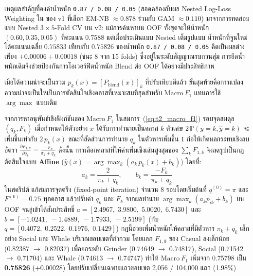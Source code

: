 เหตุผลสำคัญที่คงค่าน้ำหนัก \texttt{0.87 / 0.08 / 0.05} (สอดคล้องกับผล Nested Log-Loss Weighting ใน  ของ v1 ที่เลือก EM-NB $\approx 0.878$ ร่วมกับ GAM $\approx 0.110$) มาจากการทดสอบ  แบบ Nested $3 \times 5$-Fold CV บน v2: แม้การค้นหาบน OOF ทั้งชุดจะให้น้ำหนัก $(0.60, 0.35, 0.05)$ ที่คะแนน $0.7588$ แต่เมื่อประเมินแบบ Nested เต็มรูปแบบ น้ำหนักที่จูนใหม่ได้คะแนนเฉลี่ย $0.75833$ เทียบกับ $0.75826$ ของน้ำหนัก \texttt{0.87 / 0.08 / 0.05} คิดเป็นผลต่างเพียง $+0.00006 \pm 0.00018$ (ชนะ 8 จาก 15 folds) ซึ่งอยู่ในระดับสัญญาณรบกวนสุ่ม การยึดน้ำหนักเดิมจึงช่วยป้องกันการโอเวอร์ฟิตน้ำหนัก Blend ต่อ OOF ได้อย่างมีประสิทธิภาพ

เมื่อได้ความน่าจะเป็นรวม $p_k(x) = [P_{\mathrm{blend}}(x)]_k$ ที่ปรับเทียบดีแล้ว ขั้นสุดท้ายคือการแปลงความน่าจะเป็นให้เป็นการตัดสินใจเชิงคลาสที่เหมาะสมที่สุดสำหรับ $\mathrm{Macro}\ F_1$ แทนการใช้ $\arg\max$ แบบเดิม

\begin{decisionbox}
จากการหาอนุพันธ์เชิงฟังก์ชันของ $\mathrm{Macro}\ F_1$ ในสมการ~(\ref{eq:t2_macro_f1}) รอบจุดสมดุล $(q_k, F_k)$ เมื่อกำหนดให้ตัวอย่าง $x$ ได้รับการทำนายเป็นคลาส $k$ ตัวเศษ $2\,\mathbb{P}(y=k, \hat{y}=k)$ จะเพิ่มขึ้นเท่ากับ $2\,p_k(x)$ ขณะที่สัดส่วนการทำนาย $q_k$ ในตัวหารเพิ่มขึ้น $1$ ก่อให้เกิดผลกระทบเชิงลบอัตรา $\frac{\partial F_{1,k}}{\partial q_k} = \frac{-F_k}{\pi_k + q_k}$ ดังนั้น การเลือกคลาสที่ให้ค่าเพิ่มเชิงเส้นสูงสุดของ $\sum_k F_{1,k}$ จึงลดรูปเป็นกฎตัดสินใจแบบ \textbf{Affine} ($\hat{y}(x) = \arg\max_k (a_k\,p_k(x) + b_k)$) โดยที่:
\begin{equation}
\label{eq:t2_affine_rule}
a_k = \frac{2}{\pi_k + q_k}, \qquad b_k = \frac{-F_k}{\pi_k + q_k}
\end{equation}
ในสคริปต์  แก้สมการจุดตรึง (fixed-point iteration) จำนวน 8 รอบโดยเริ่มต้นที่ $q^{(0)} = \pi$ และ $F^{(0)} = 0.75$ ทุกคลาส แล้วปรับค่า $q_k$ และ $F_k$ จากผลทำนาย $\arg\max_k (a_k p_{ik} + b_k)$ บน OOF จนลู่เข้าได้สัมประสิทธิ์ $a = [2.4967,\; 3.9800,\; 5.0020,\; 6.7430]$ และ $b = [-1.0241,\; -1.4889,\; -1.7933,\; -2.5199]$ (กับ $q = [0.4072,\; 0.2522,\; 0.1976,\; 0.1429]$) กฎนี้ช่วยเพิ่มน้ำหนักให้คลาสที่มีตัวหาร $\pi_k+q_k$ เล็กอย่าง Social และ Whale บริเวณขอบเขตที่กำกวม โดยแลก $F_{1,0}$ ของ Casual ลงเล็กน้อย (0.82387 $\to$ 0.82037) เพื่อยกระดับ Grinder (0.74649 $\to$ 0.74817), Social (0.71542 $\to$ 0.71704) และ Whale (0.74613 $\to$ 0.74747) ทำให้ $\mathrm{Macro}\ F_1$ เพิ่มจาก 0.75798 เป็น \textbf{0.75826} (+0.00028) โดยปรับเปลี่ยนเฉพาะแถวขอบเขต 2,056 / 104,000 แถว (1.98\%)
\end{decisionbox}

